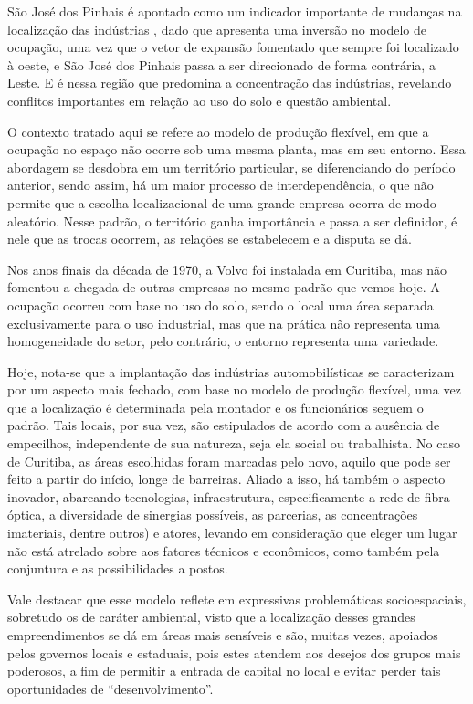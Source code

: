 	São José dos Pinhais é apontado como um indicador importante de mudanças na localização das indústrias \cite{firkowski2002b}, dado que apresenta uma inversão no modelo de ocupação, uma vez que o vetor de expansão fomentado que sempre foi localizado à oeste, e São José dos Pinhais passa a ser direcionado de forma contrária, a Leste. E é nessa região que predomina a concentração das indústrias, revelando conflitos importantes em relação ao uso do solo e questão ambiental.

	O contexto tratado aqui se refere ao modelo de produção flexível, em que a ocupação no espaço não ocorre sob uma mesma planta, mas em seu entorno. Essa abordagem se desdobra em um território particular, se diferenciando do período anterior, sendo assim, há um maior processo de interdependência, o que não permite que a escolha localizacional de uma grande empresa ocorra de modo aleatório. Nesse padrão, o território ganha importância e passa a ser definidor, é nele que as trocas ocorrem, as relações se estabelecem e a disputa se dá. 
	
	Nos anos finais da década de 1970, a Volvo foi instalada em Curitiba, mas não fomentou a chegada de outras empresas no mesmo padrão que vemos hoje. A ocupação ocorreu com base no uso do solo, sendo o local uma área separada exclusivamente para o uso industrial, mas que na prática não representa uma homogeneidade do setor, pelo contrário, o entorno representa uma variedade.
	
	Hoje, nota-se que a implantação das indústrias automobilísticas se caracterizam por um aspecto mais fechado, com base no modelo de produção flexível, uma vez que a localização é determinada pela montador e os funcionários seguem o padrão. Tais locais, por sua vez, são estipulados de acordo com a ausência de empecilhos, independente de sua natureza, seja ela social ou trabalhista. No caso de Curitiba, as áreas escolhidas foram marcadas pelo novo, aquilo que pode ser feito a partir do início, longe de barreiras. Aliado a isso, há também o aspecto inovador, abarcando tecnologias, infraestrutura, especificamente a rede de fibra óptica, a diversidade de sinergias possíveis, as parcerias, as concentrações imateriais, dentre outros) e atores, levando em consideração que eleger um lugar não está atrelado sobre aos fatores técnicos e econômicos, como também pela conjuntura e as possibilidades a postos.

	Vale destacar que esse modelo reflete em expressivas problemáticas socioespaciais, sobretudo os de caráter ambiental, visto que a localização desses grandes empreendimentos se dá em áreas mais sensíveis e são, muitas vezes, apoiados pelos governos locais e estaduais, pois estes atendem aos desejos dos grupos mais poderosos, a fim de permitir a entrada de capital no local e evitar perder tais oportunidades de ``desenvolvimento''. 
	
